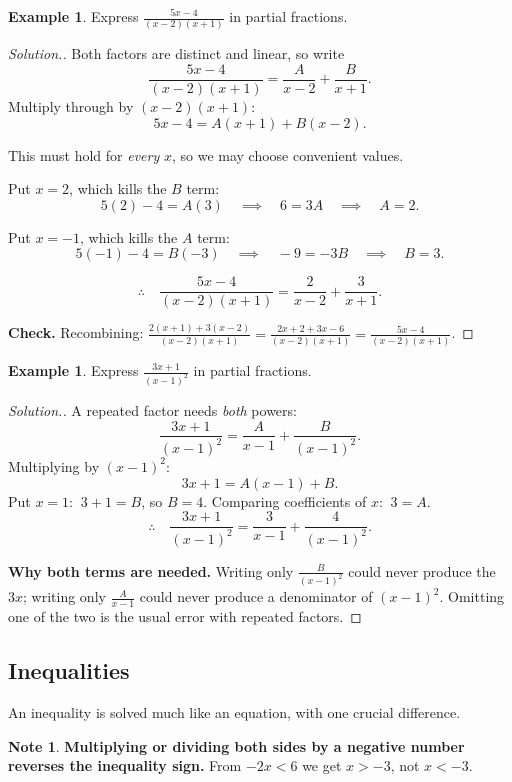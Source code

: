 \documentclass[11pt,a4paper]{article}
\theoremstyle{definition}
\newtheorem{example}[thm]{Example}
\newtheorem{note}[thm]{Note}
\newenvironment{solution}
  {\renewcommand{\qedsymbol}{}\begin{proof}[\textit{Solution}.]}
  {\end{proof}}
\begin{document}
\begin{example}
Express $\frac{5x-4}{(x-2)(x+1)}$ in partial fractions.
\end{example}

\begin{solution}
Both factors are distinct and linear, so write
$$\frac{5x-4}{(x-2)(x+1)}=\frac{A}{x-2}+\frac{B}{x+1}.$$
Multiply through by $(x-2)(x+1)$:
$$5x-4=A(x+1)+B(x-2).$$

This must hold for \emph{every} $x$, so we may choose convenient values.

Put $x=2$, which kills the $B$ term:
$$5(2)-4=A(3)\quad\implies\quad 6=3A\quad\implies\quad A=2.$$

Put $x=-1$, which kills the $A$ term:
$$5(-1)-4=B(-3)\quad\implies\quad -9=-3B\quad\implies\quad B=3.$$

$$\therefore\quad \frac{5x-4}{(x-2)(x+1)}=\frac{2}{x-2}+\frac{3}{x+1}.$$

\textbf{Check.} Recombining:
$\frac{2(x+1)+3(x-2)}{(x-2)(x+1)}=\frac{2x+2+3x-6}{(x-2)(x+1)}=\frac{5x-4}{(x-2)(x+1)}$.
\end{solution}

\begin{example}
Express $\frac{3x+1}{(x-1)^2}$ in partial fractions.
\end{example}

\begin{solution}
A repeated factor needs \emph{both} powers:
$$\frac{3x+1}{(x-1)^2}=\frac{A}{x-1}+\frac{B}{(x-1)^2}.$$
Multiplying by $(x-1)^2$:
$$3x+1=A(x-1)+B.$$
Put $x=1$: $\ 3+1=B$, so $B=4$.
Comparing coefficients of $x$: $\ 3=A$.
$$\therefore\quad \frac{3x+1}{(x-1)^2}=\frac{3}{x-1}+\frac{4}{(x-1)^2}.$$

\textbf{Why both terms are needed.} Writing only $\frac{B}{(x-1)^2}$ could never produce
the $3x$; writing only $\frac{A}{x-1}$ could never produce a denominator of
$(x-1)^2$. Omitting one of the two is the usual error with repeated factors.
\end{solution}

\subsection{Inequalities}

An inequality is solved much like an equation, with one crucial difference.

\begin{note}
\textbf{Multiplying or dividing both sides by a negative number reverses the
inequality sign.} From $-2x<6$ we get $x>-3$, not $x<-3$.
\end{note}
\end{document}
